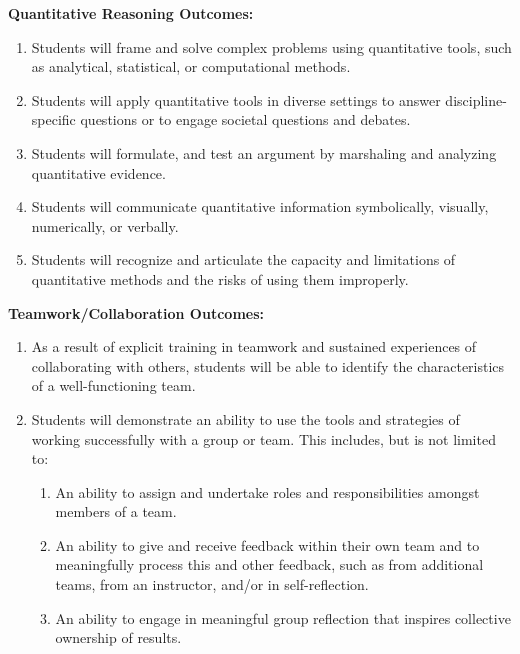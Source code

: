 \documentclass[11pt]{article}
\begin{document}
\textbf{Quantitative Reasoning Outcomes:}

\begin{samepage}
\begin{enumerate}
\item[1.] Students will frame and solve complex problems using quantitative tools, such as analytical, statistical, or computational methods.
\item[2.] Students will apply quantitative tools in diverse settings to answer discipline-specific questions or to engage societal questions and debates.
\item[3.] Students will formulate, and test an argument by marshaling and analyzing quantitative evidence.
\item[4.] Students will communicate quantitative information symbolically, visually, numerically, or verbally.
\item[5.] Students will recognize and articulate the capacity and limitations of quantitative methods and the risks of using them improperly.
\end{enumerate}
\end{samepage}

\textbf{Teamwork/Collaboration Outcomes:}

\begin{samepage}
\begin{enumerate}
\item[1.] As a result of explicit training in teamwork and sustained experiences of collaborating with others, students will be able to identify the characteristics of a well-functioning team.
\item[2.] Students will demonstrate an ability to use the tools and strategies of working successfully with a group or team. This includes, but is not limited to:
\begin{enumerate}
\item[a.] An ability to assign and undertake roles and responsibilities amongst members of a team.
\item[b.] An ability to give and receive feedback within their own team and to meaningfully process this and other feedback, such as from additional teams, from an instructor, and/or in self-reflection.
\item[c.] An ability to engage in meaningful group reflection that inspires collective ownership of results.
\end{enumerate}
\end{enumerate}
\end{samepage}
\end{document}
